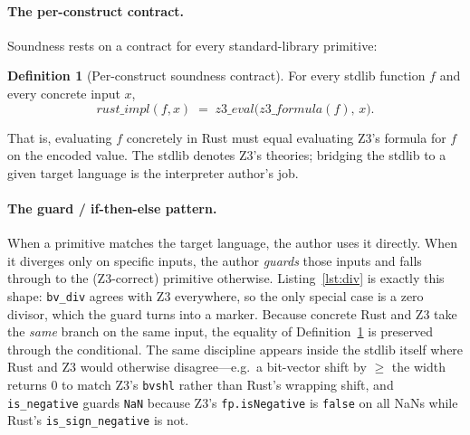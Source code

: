 \documentclass[11pt,a4paper]{article}
\theoremstyle{definition}
\newtheorem{definition}{Definition}
\theoremstyle{remark}
\newcommand{\code}[1]{\texttt{#1}}
\begin{document}
\paragraph{The per-construct contract.}
Soundness rests on a contract for every standard-library primitive:
\begin{definition}[Per-construct soundness contract]\label{def:contract}
For every stdlib function $f$ and every concrete input $x$,
\[
  \mathit{rust\_impl}(f, x) \;=\; \mathit{z3\_eval}\bigl(\mathit{z3\_formula}(f),\, x\bigr).
\]
\end{definition}
That is, evaluating $f$ concretely in Rust must equal evaluating Z3's formula for
$f$ on the encoded value. The stdlib denotes Z3's theories; bridging the stdlib
to a given target language is the interpreter author's job.

\paragraph{The guard / if-then-else pattern.}
When a primitive matches the target language, the author uses it directly. When it
diverges only on specific inputs, the author \emph{guards} those inputs and falls
through to the (Z3-correct) primitive otherwise. Listing~\ref{lst:div} is exactly
this shape: \code{bv\_div} agrees with Z3 everywhere, so the only special case is
a zero divisor, which the guard turns into a marker. Because concrete Rust and Z3
take the \emph{same} branch on the same input, the equality of
Definition~\ref{def:contract} is preserved through the conditional. The same
discipline appears inside the stdlib itself where Rust and Z3 would otherwise
disagree---e.g.\ a bit-vector shift by $\geq$ the width returns $0$ to match Z3's
\code{bvshl} rather than Rust's wrapping shift, and \code{is\_negative} guards
\code{NaN} because Z3's \code{fp.isNegative} is \code{false} on all NaNs while
Rust's \code{is\_sign\_negative} is not.
\end{document}
